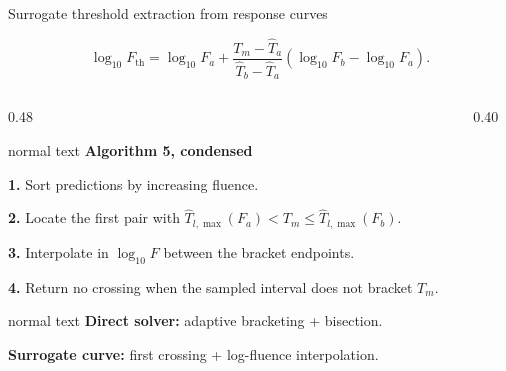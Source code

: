 \documentclass[aspectratio=169,10pt]{beamer}
\begin{document}
\begin{frame}[t]{Surrogate threshold extraction from response curves}
  \hypertarget{supp:threshold-surrogate-inversion}{}
  \vspace{-0.18cm}\hfill
  \hspace{0.10cm}\GVBackupIndexButton
  \vspace{0.04cm}
  \begin{center}
    \normalsize
    \[
      \log_{10}F_{\mathrm{th}}
      =
      \log_{10}F_a
      +
      \frac{T_m-\widehat T_a}{\widehat T_b-\widehat T_a}
      \left(\log_{10}F_b-\log_{10}F_a\right).
    \]
  \end{center}
  \vspace{-0.18cm}
  \begin{columns}[T,totalwidth=0.94\textwidth]
    \begin{column}{0.48\textwidth}
      \begin{beamercolorbox}[wd=\linewidth,sep=0.60em]{normal text}
        \small\textbf{\color{GVTeal}Algorithm 5, condensed}\par
        \vspace{0.10cm}
        \scriptsize
        \textbf{1.} Sort predictions by increasing fluence.\par
        \textbf{2.} Locate the first pair with \(\widehat T_{l,\max}(F_a)<T_m\leq\widehat T_{l,\max}(F_b)\).\par
        \textbf{3.} Interpolate in \(\log_{10}F\) between the bracket endpoints.\par
        \textbf{4.} Return no crossing when the sampled interval does not bracket \(T_m\).
      \end{beamercolorbox}
      \vspace{0.16cm}
      \begin{beamercolorbox}[wd=\linewidth,sep=0.54em]{normal text}
        \scriptsize
        \textbf{\color{GVCouplingOrange}Direct solver:} adaptive bracketing + bisection.\par
        \textbf{\color{GVSourceBlue}Surrogate curve:} first crossing + log-fluence interpolation.
      \end{beamercolorbox}
    \end{column}
    \begin{column}{0.40\textwidth}
      \centering
      \begin{tikzpicture}[>=stealth,x=0.77cm,y=0.68cm]

\end{tikzpicture}
\end{column}
\end{columns}
\end{frame}
\end{document}
